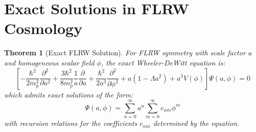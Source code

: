 \documentclass{article}
\newtheorem{theorem}{Theorem}
\begin{document}
\section{Exact Solutions in FLRW Cosmology}

\begin{theorem}[Exact FLRW Solution]
  For FLRW symmetry with scale factor $a$ and homogeneous scalar field $\phi$,
  the exact Wheeler-DeWitt equation is:
  \begin{equation}
    \left[ - \frac{\hbar^2}{2 m_p^2}  \frac{\partial^2}{\partial a^2} +
    \frac{3 \hbar^2}{8 m_p^2}  \frac{1}{a}  \frac{\partial}{\partial a} +
    \frac{\hbar^2}{2 a^3}  \frac{\partial^2}{\partial \phi^2} + a (1 - \Lambda
    a^2) + a^3 V (\phi) \right] \Psi (a, \phi) = 0
  \end{equation}
  which admits exact solutions of the form:
  \begin{equation}
    \Psi (a, \phi) = \sum_{n = 0}^{\infty} a^n  \sum_{m = 0}^{\infty} c_{nm}
    \phi^m
  \end{equation}
  with recursion relations for the coefficients $c_{nm}$ determined by the
  equation.
\end{theorem}
\end{document}
